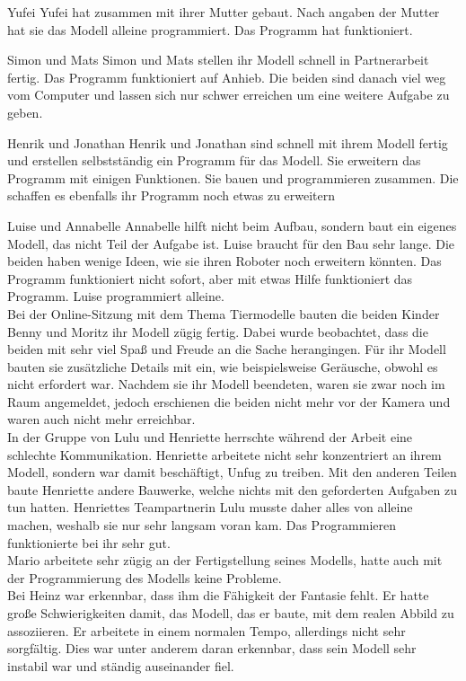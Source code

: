 Yufei
Yufei hat zusammen mit ihrer Mutter gebaut. Nach angaben der Mutter hat sie das Modell alleine programmiert. Das Programm hat funktioniert.

Simon und Mats
Simon und Mats stellen ihr Modell schnell in Partnerarbeit fertig. Das Programm funktioniert auf Anhieb. Die beiden sind danach viel weg vom Computer und lassen sich nur schwer erreichen um eine weitere Aufgabe zu geben. 

Henrik und Jonathan
Henrik und Jonathan sind schnell mit ihrem Modell fertig und erstellen selbstständig ein Programm für das Modell. Sie erweitern das Programm mit einigen Funktionen. Sie bauen und programmieren zusammen. Die schaffen es ebenfalls ihr Programm noch etwas zu erweitern

Luise und Annabelle
Annabelle hilft nicht beim Aufbau, sondern baut ein eigenes Modell, das nicht Teil der Aufgabe ist. Luise braucht für den Bau sehr lange. Die beiden haben wenige Ideen, wie sie ihren Roboter noch erweitern könnten. Das Programm funktioniert nicht sofort, aber mit etwas Hilfe funktioniert das Programm. Luise programmiert alleine.\\



Bei der Online-Sitzung mit dem Thema Tiermodelle  bauten die beiden Kinder Benny und Moritz ihr Modell zügig fertig. Dabei wurde beobachtet, dass die beiden mit sehr viel Spaß und Freude an die Sache herangingen. Für ihr Modell bauten sie zusätzliche Details mit ein, wie beispielsweise Geräusche, obwohl es nicht erfordert war. Nachdem sie ihr Modell beendeten, waren sie zwar noch im Raum angemeldet, jedoch erschienen die beiden nicht mehr vor der Kamera und waren auch nicht mehr erreichbar.\\
In der Gruppe von Lulu und Henriette herrschte während der Arbeit eine schlechte Kommunikation. Henriette arbeitete nicht sehr konzentriert an ihrem Modell, sondern war damit beschäftigt, Unfug zu treiben. Mit den anderen Teilen baute Henriette andere Bauwerke, welche nichts mit den geforderten Aufgaben zu tun hatten. Henriettes Teampartnerin Lulu musste daher alles von alleine machen, weshalb sie nur sehr langsam voran kam. Das Programmieren funktionierte bei ihr sehr gut.\\
Mario arbeitete sehr zügig an der Fertigstellung seines Modells, hatte auch mit der Programmierung des Modells keine Probleme.\\
Bei Heinz war erkennbar, dass ihm die Fähigkeit der Fantasie fehlt. Er hatte große Schwierigkeiten damit, das Modell, das er baute, mit dem realen Abbild zu assoziieren. Er arbeitete in einem normalen Tempo, allerdings nicht sehr sorgfältig. Dies war unter anderem daran erkennbar, dass sein Modell sehr instabil war und ständig auseinander fiel.

